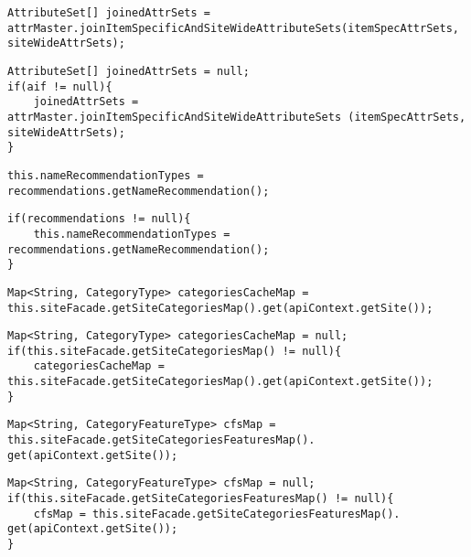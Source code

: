 \begin{lstlisting}[firstnumber=95, caption={joinItemSpecificAndSiteWideAttributeSets invocation}]
AttributeSet[] joinedAttrSets = attrMaster.joinItemSpecificAndSiteWideAttributeSets(itemSpecAttrSets, siteWideAttrSets);
\end{lstlisting}
\begin{lstlisting}[firstnumber=95, caption={joinItemSpecificAndSiteWideAttributeSets invocation possible solution}]
AttributeSet[] joinedAttrSets = null;
if(aif != null){
    joinedAttrSets = attrMaster.joinItemSpecificAndSiteWideAttributeSets (itemSpecAttrSets, siteWideAttrSets);
}
\end{lstlisting}
\noindent\makebox[\linewidth]{\rule{\linewidth}{0.4pt}}

\begin{lstlisting}[firstnumber=108, caption={getNameRecommendation invocation}]
this.nameRecommendationTypes = recommendations.getNameRecommendation();
\end{lstlisting}
\begin{lstlisting}[firstnumber=108, caption={getNameRecommendation invocation possible solution}]
if(recommendations != null){
    this.nameRecommendationTypes = recommendations.getNameRecommendation();
}
\end{lstlisting}
\noindent\makebox[\linewidth]{\rule{\linewidth}{0.4pt}}

\begin{lstlisting}[firstnumber=112, caption={get invocation}]
Map<String, CategoryType> categoriesCacheMap = this.siteFacade.getSiteCategoriesMap().get(apiContext.getSite());
\end{lstlisting}
\begin{lstlisting}[firstnumber=112, caption={get invocation possible solution}]
Map<String, CategoryType> categoriesCacheMap = null;
if(this.siteFacade.getSiteCategoriesMap() != null){
    categoriesCacheMap = this.siteFacade.getSiteCategoriesMap().get(apiContext.getSite());
}
\end{lstlisting}
\noindent\makebox[\linewidth]{\rule{\linewidth}{0.4pt}}

\begin{lstlisting}[firstnumber=114, caption={get invocation}]
Map<String, CategoryFeatureType> cfsMap = this.siteFacade.getSiteCategoriesFeaturesMap(). get(apiContext.getSite());
\end{lstlisting}
\begin{lstlisting}[firstnumber=114, caption={get invocation possible solution}]
Map<String, CategoryFeatureType> cfsMap = null;
if(this.siteFacade.getSiteCategoriesFeaturesMap() != null){
    cfsMap = this.siteFacade.getSiteCategoriesFeaturesMap(). get(apiContext.getSite());
}
\end{lstlisting}
\noindent\makebox[\linewidth]{\rule{\linewidth}{0.4pt}}

